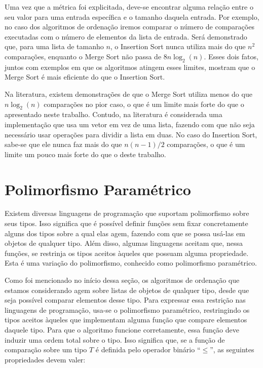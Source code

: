 \documentclass[12pt, oneside, a4paper,english,brazil]{abntex2}
\begin{document}
\qquad Uma vez que a m\'etrica foi explicitada, deve-se encontrar alguma rela\c{c}\~ao entre o seu valor para
uma entrada espec\'ifica e o tamanho daquela entrada. Por exemplo, no caso dos algoritmos de ordena\c{c}\~ao
iremos comparar o n\'umero de compara\c{c}\~oes executadas com o n\'umero de elementos da lista de entrada.
Ser\'a demonstrado que, para uma lista de tamanho $n$, o Insertion Sort nunca utiliza mais do que $n^{2}$ compara\c{c}\~oes, enquanto o Merge Sort n\~ao passa de $8 n \log_{2} (n)$. Esses dois fatos,
juntos com exemplos em que os algoritmos atingem esses limites, mostram que o Merge Sort \'e mais eficiente
do que o Insertion Sort.

\qquad Na literatura, existem demonstra\c{c}\~oes de que o Merge Sort utiliza menos do que $n\log_{2}(n)$
compara\c{c}\~oes no pior caso\cite{1}, o que \'e um limite mais forte do que o apresentado neste trabalho. Contudo, na literatura \'e considerada uma implementa\c{c}\~ao que usa um vetor em vez de uma lista,
fazendo com que n\~ao seja necess\'ario usar opera\c{c}\~oes para dividir a lista em duas. No caso do Insertion Sort, sabe-se que ele nunca faz mais do
que $n(n - 1) / 2$ compara\c{c}\~oes, o que \'e um limite um pouco mais forte
do que o deste trabalho.

\section{Polimorfismo Param\'etrico}

\qquad Existem diversas linguagens de programa\c{c}\~ao que suportam polimorfismo sobre seus tipos. Isso
significa que \'e poss\'ivel definir fun\c{c}\~oes sem fixar concretamente alguns dos tipos sobre a qual elas
agem, fazendo com que se possa us\'a-las em objetos de qualquer tipo. Al\'em disso, algumas linguagens
aceitam que, nessa fun\c{c}\~oes, se restrinja os tipos aceitos \`aqueles que possuam alguma propriedade.
Esta \'e uma varia\c{c}\~ao do polimorfismo, conhecido como polimorfismo param\'etrico.

\qquad Como foi mencionado no in\'icio dessa se\c{c}\~ao, os algoritmos de ordena\c{c}\~ao que estamos
considerando agem sobre listas de objetos de qualquer tipo, desde que seja poss\'ivel comparar elementos
desse tipo. Para expressar essa restri\c{c}\~ao nas linguagens de programa\c{c}\~ao, usa-se o polimorfismo
param\'etrico, restringindo os tipos aceitos \`aqueles que implementam alguma fun\c{c}\~ao que compare
elementos daquele tipo. Para que o algoritmo funcione corretamente, essa fun\c{c}\~ao deve induzir uma ordem
total sobre o tipo. Isso significa que, se a fun\c{c}\~ao de compara\c{c}\~ao sobre um tipo $T$ \'e definida
pelo operador bin\'ario ``$\le$'', as seguintes propriedades devem valer:
\end{document}
